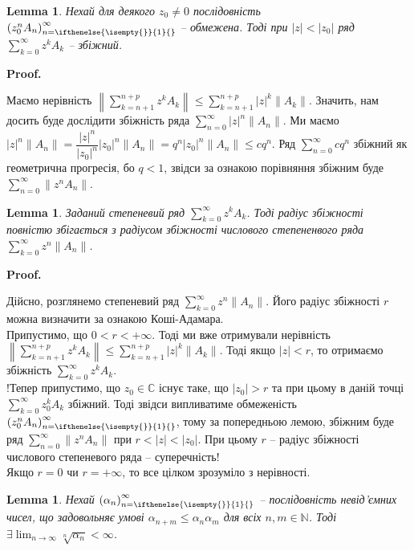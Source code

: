 \documentclass[a4paper, 10pt]{article}
\makeatletter
\theoremstyle{theoremdd}
\theoremstyle{theoremdd}
\theoremstyle{theoremdd}
\theoremstyle{theoremdd}
\theoremstyle{theoremdd}
\theoremstyle{theoremdd}
\theoremstyle{theoremdd}
\newtheorem{lemma}[theorem]{Lemma}
\theoremstyle{theoremdd}
\newcommand{\sequence}[2][]{\left({#2}\right)_{n=\ifthenelse{\isempty{#1}}{1}{#1}}^{\infty}}
\renewenvironment{proof}[1][Proof.\\]{\par
\pushQED{\hfill \qed}%
\normalfont \topsep6\p@\@plus6\p@\relax
\trivlist
\item\relax
{\bfseries
#1\@addpunct{.}}\hspace\labelsep\ignorespaces
}{%
\popQED\endtrivlist\@endpefalse
}
\makeatother
\begin{document}
\begin{lemma}
Нехай для деякого $z_0 \neq 0$ послідовність $\sequence{z_0^n A_n}$ -- обмежена. Тоді при $|z| < |z_0|$ ряд $\displaystyle\sum_{k=0}^\infty z^k A_k$ -- збіжний.
\end{lemma}

\begin{proof}
Маємо нерівність $\displaystyle \left\| \sum_{k=n+1}^{n+p} z^k A_k \right\| \leq \sum_{k=n+1}^{n+p} |z|^k \|A_k\|$. Значить, нам досить буде дослідити збіжність ряда $\displaystyle\sum_{n=0}^\infty |z|^n \|A_n\|$. Ми маємо $|z|^n \|A_n\| = \dfrac{|z|^n}{|z_0|^n} |z_0|^n \|A_n\| = q^n |z_0|^n \|A_n\| \leq c q^n$. Ряд $\displaystyle\sum_{n=0}^\infty cq^n$ збіжний як геометрична прогресія, бо $q < 1$, звідси за ознакою порівняння збіжним буде $\displaystyle\sum_{n=0}^\infty \|z^n A_n\|$.
\end{proof}

\begin{lemma}
Заданий степеневий ряд $\displaystyle\sum_{k=0}^\infty z^k A_k$. Тоді радіус збіжності повністю збігається з радіусом збіжності числового степененвого ряда $\displaystyle\sum_{k=0}^\infty z^n \|A_n\|$.
\end{lemma}

\begin{proof}
Дійсно, розглянемо степеневий ряд $\displaystyle\sum_{k=0}^\infty z^n \|A_n\|$. Його радіус збіжності $r$ можна визначити за ознакою Коші-Адамара.\\ Припустимо, що $0 < r < +\infty$. Тоді ми вже отримували нерівність $\displaystyle\left\|\sum_{k=n+1}^{n+p} z^k A_k\right\| \leq \sum_{k=n+1}^{n+p} |z|^k \|A_k\|$. Тоді якщо $|z| < r$, то отримаємо збіжність $\displaystyle\sum_{k=0}^\infty z^k A_k$.\\
!Тепер припустимо, що $z_0 \in \mathbb{C}$ існує таке, що $|z_0| > r$ та при цьому в даній точці $\displaystyle\sum_{k=0}^\infty z_0^k A_k$ збіжний. Тоді звідси випливатиме обмеженість $\sequence{z_0^n A_n}$, тому за попередньою лемою, збіжним буде  ряд $\displaystyle\sum_{n=0}^\infty \|z^n A_n\|$ при $r < |z| < |z_0|$. При цьому $r$ -- радіус збіжності числового степеневого ряда -- суперечність!
\bigskip \\
Якщо $r = 0$ чи $r = +\infty$, то все цілком зрозуміло з нерівності.
\end{proof}

\begin{lemma}
Нехай $\sequence{\alpha_n}$ -- послідовність невід'ємних чисел, що задовольняє умові $\alpha_{n+m} \leq \alpha_n \alpha_m$ для всіх $n,m \in \mathbb{N}$. Тоді $\exists \displaystyle\lim_{n \to \infty} \sqrt[n]{\alpha_n} < \infty$.
\end{lemma}
\end{document}
